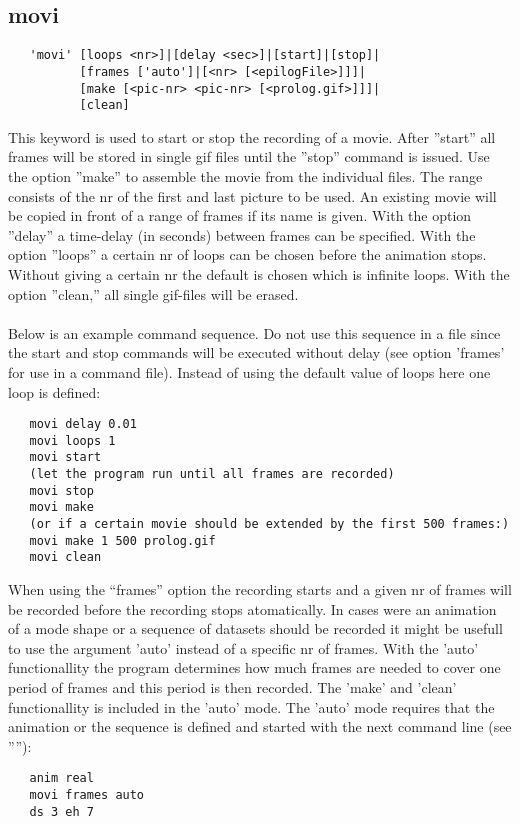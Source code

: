 \documentclass{article}
\begin{document}
\subsection{\label{movi}movi}
\begin{verbatim}
   'movi' [loops <nr>]|[delay <sec>]|[start]|[stop]|
          [frames ['auto']|[<nr> [<epilogFile>]]]|
          [make [<pic-nr> <pic-nr> [<prolog.gif>]]]|
          [clean]
\end{verbatim}
This keyword is used to start or stop the recording of a movie. After ''start'' all frames will be stored in single gif files until the ''stop'' command is issued. Use the option ''make'' to assemble the movie from the individual files. The range consists of the nr of the first and last picture to be used. An existing movie will be copied in front of a range of frames if its name is given. With the option ''delay'' a time-delay (in seconds) between frames can be specified. With the option ''loops'' a certain nr of loops can be chosen before the animation stops. Without giving a certain nr the default is chosen which is infinite loops. With the option ''clean,'' all single gif-files will be erased.\\\\Below is an example command sequence. Do not use this sequence in a file since the start and stop commands will be executed without delay (see option 'frames' for use in a command file). Instead of using the default value of loops here one loop is defined:
\begin{verbatim}
   movi delay 0.01
   movi loops 1
   movi start
   (let the program run until all frames are recorded)
   movi stop
   movi make
   (or if a certain movie should be extended by the first 500 frames:)
   movi make 1 500 prolog.gif
   movi clean 
\end{verbatim}
When using the ``frames'' option the recording starts and a given nr of frames will be recorded before the recording stops atomatically. In cases were an animation of a mode shape or a sequence of datasets should be recorded it might be usefull to use the argument 'auto' instead of a specific nr of frames. With the 'auto' functionallity the program determines how much frames are needed to cover one period of frames and this period is then recorded. The 'make' and 'clean' functionallity is included in the 'auto' mode. The 'auto' mode requires that the animation or the sequence is defined and started with the next command line (see ''''):
\begin{verbatim}
   anim real
   movi frames auto
   ds 3 eh 7
\end{verbatim}
\end{document}
